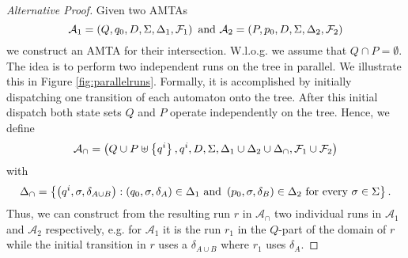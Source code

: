 \begin{proof}[Alternative Proof]
  Given two \acp{AMTA}
  \begin{equation*}
    \mathcal{A}_{1} = \left(Q, q_{0}, D, \Sigma, \Delta_{1}, \mathcal{F}_{1}\right)
      \text{ and }
    \mathcal{A}_{2} = \left(P, p_{0}, D, \Sigma, \Delta_{2}, \mathcal{F}_{2}\right)
  \end{equation*}
  we construct an \ac{AMTA} for their intersection. W.l.o.g. we assume that 
  $Q\cap P = \emptyset$. The idea is to perform two independent runs on the 
  tree in parallel. We illustrate this in Figure \ref{fig:parallelruns}. 
  Formally, it is accomplished by initially dispatching one transition of each 
  automaton onto the tree. After this initial dispatch both state sets $Q$ and
  $P$ operate independently on the tree. Hence, we define
  \begin{equation*}
    \mathcal{A}_{\cap} = \left(
      Q\cup P\uplus\left\{q^{i}\right\}, q^{i}, D, \Sigma, 
      \Delta_{1}\cup\Delta_{2}\cup\Delta_{\cap}, 
      \mathcal{F}_{1}\cup\mathcal{F}_{2}
    \right)
  \end{equation*}
  with
  \begin{equation*}
    \Delta_{\cap} = \left\{
      \left(q^{i},\sigma,\delta_{A\cup B}\right):
        \left(q_{0},\sigma,\delta_{A}\right)\in\Delta_{1}
      \text{ and }
        \left(p_{0},\sigma,\delta_{B}\right)\in\Delta_{2}
      \text{ for every }
        \sigma\in\Sigma
    \right\}.
  \end{equation*}
  Thus, we can construct from the resulting run $r$ in $\mathcal{A}_{\cap}$ two
  individual runs in $\mathcal{A}_{1}$ and $\mathcal{A}_{2}$ respectively, e.g.
  for $\mathcal{A}_{1}$ it is the run $r_{1}$ in the $Q$-part of the domain of 
  $r$ while the initial transition in $r$ uses a $\delta_{A\cup B}$ where 
  $r_{1}$ uses $\delta_{A}$.
\end{proof}

